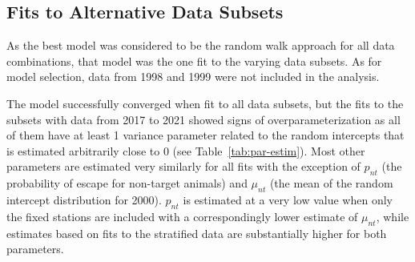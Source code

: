 \documentclass[12pt]{article}\usepackage[]{graphicx}\usepackage[]{color}
\begin{document}
\hypertarget{fits-to-alternative-data-subsets}{%
\subsection{Fits to Alternative Data Subsets}\label{fits-to-alternative-data-subsets}}

As the best model was considered to be the random walk approach for all data combinations, that model was the one fit to the varying data subsets. As for model selection, data from 1998 and 1999 were not included in the analysis.

The model successfully converged when fit to all data subsets, but the fits to the subsets with data from 2017 to 2021 showed signs of overparameterization as all of them have at least 1 variance parameter related to the random intercepts that is estimated arbitrarily close to 0 (see Table~\ref{tab:par-estim}). Most other parameters are estimated very similarly for all fits with the exception of \(p_{nt}\) (the probability of escape for non-target animals) and \(\mu_{nt}\) (the mean of the random intercept distribution for 2000). \(p_{nt}\) is estimated at a very low value when only the fixed stations are included with a correspondingly lower estimate of \(\mu_{nt}\), while estimates based on fits to the stratified data are substantially higher for both parameters.
\end{document}
